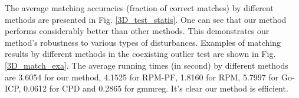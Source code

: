 \documentclass[11pt,bezier,]{article}
\begin{document}
The average matching accuracies (fraction of correct matches)
by
different 
methods  are presented in Fig. \ref{3D_test_statis}. 
One can see that our method performs considerably better than  other methods.
This demonstrates our method's robustness to various types of disturbances.
Examples of matching results by different methods in the 
coexisting outlier test are shown  in Fig. \ref{3D_match_exa}.
The average running times (in second) by different methods are %
   3.6054 for our method,
    4.1525 for RPM-PF,
    1.8160 for RPM,
    5.7997 for Go-ICP,
    0.0612 for CPD and
    0.2865 for gmmreg.
It's clear our method is  efficient.
    
    
  
\end{document}
